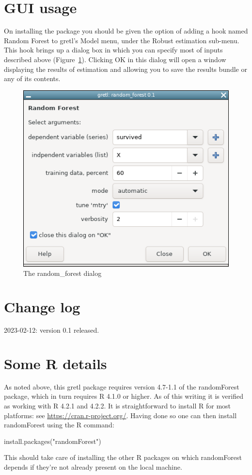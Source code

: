 \documentclass{article}
\begin{document}
\section{GUI usage}

On installing the package you should be given the option of adding a
hook named \textsf{Random Forest} to gretl's \textsf{Model} menu,
under the \textsf{Robust estimation} sub-menu. This hook brings up a
dialog box in which you can specify most of inputs described above
(Figure~\ref{fig:dialog}). Clicking \textsf{OK} in this dialog will
open a window displaying the results of estimation and allowing you to
save the results bundle or any of its contents.

\begin{figure}[htbp]
  \centering
  \includegraphics[scale=0.6]{rfgui.png}
  \caption{The random\_forest dialog}
  \label{fig:dialog}
\end{figure}

\section{Change log}

2023-02-12: version 0.1 released.

\section{Some \textsf{R} details}
\label{sec:Rdetails}

As noted above, this gretl package requires version 4.7-1.1 of the
\textsf{randomForest} package, which in turn requires \textsf{R} 4.1.0
or higher. As of this writing it is verified as working with
\textsf{R} 4.2.1 and 4.2.2. It is straightforward to install
\textsf{R} for most platforms: see
\url{https://cran.r-project.org/}. Having done so one can then install
\textsf{randomForest} using the \textsf{R} command:
\begin{code}
install.packages("randomForest")
\end{code}
This should take care of installing the other \textsf{R} packages on
which \textsf{randomForest} depends if they're not already present on
the local machine.
\end{document}
